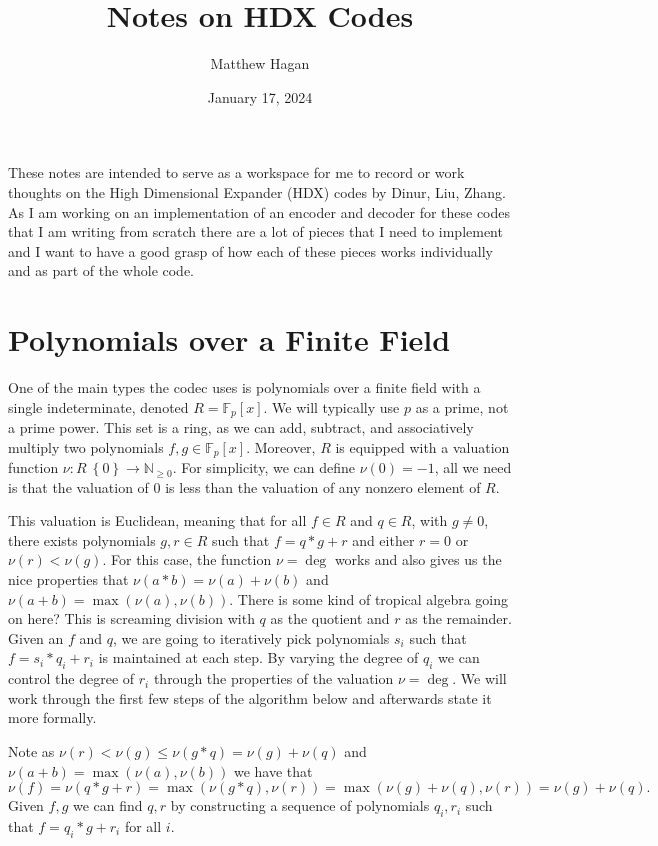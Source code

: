 \documentclass{article}
\title{Notes on HDX Codes}
\author{Matthew Hagan}
\date{January 17, 2024}
\newcommand{\set}[1]{\left\{ #1 \right\}}
\newcommand{\field}{\mathbb{F}}
\begin{document}
\maketitle
These notes are intended to serve as a workspace for me to record or work thoughts on the High Dimensional Expander (HDX) codes by Dinur, Liu, Zhang. As I am working on an implementation of an encoder and decoder for these codes that I am writing from scratch there are a lot of pieces that I need to implement and I want to have a good grasp of how each of these pieces works individually and as part of the whole code. 

\section{Polynomials over a Finite Field}
One of the main types the codec uses is polynomials over a finite field with a single indeterminate, denoted $R = \field_p [x]$. We will typically use $p$ as a prime, not a prime power. This set is a ring, as we can add, subtract, and associatively multiply two polynomials $f, g \in \field_p[x]$. Moreover, $R$ is equipped with a valuation function $\nu : R \ \set{0} \to \mathbb{N}_{\geq 0}$. For simplicity, we can define $\nu(0) = - 1$, all we need is that the valuation of 0 is less than the valuation of any nonzero element of $R$. 

This valuation is Euclidean, meaning that for all $f \in R$ and $q \in R$, with $g \neq 0$, there exists polynomials $g, r \in R$ such that $f = q * g + r$ and either $r = 0$ or $\nu(r) < \nu(g)$. For this case, the function $\nu = \deg$ works and also gives us the nice properties that $\nu(a * b) = \nu(a) + \nu(b)$ and $\nu(a + b) = \max(\nu(a), \nu(b))$. There is some kind of tropical algebra going on here? This is screaming division with $q$ as the quotient and $r$ as the remainder. Given an $f$ and $q$, we are going to iteratively pick polynomials $s_i$ such that $f = s_i* q_i + r_i$ is maintained at each step. By varying the degree of $q_i$ we can control the degree of $r_i$ through the properties of the valuation $\nu = \deg$. We will work through the first few steps of the algorithm below and afterwards state it more formally. 

Note as $\nu(r) < \nu(g) \leq \nu(g * q) = \nu(g) + \nu(q)$ and $\nu(a + b) = \max (\nu(a), \nu(b))$ we have that 
$$\nu(f) = \nu(q * g + r) = \max(\nu(g * q), \nu(r)) = \max(\nu(g) + \nu(q), \nu(r)) = \nu(g) + \nu(q).$$
Given $f, g$ we can find $q,r$ by constructing a sequence of polynomials $q_i, r_i$ such that $f = q_i * g + r_i$ for all $i$. 
\end{document}
